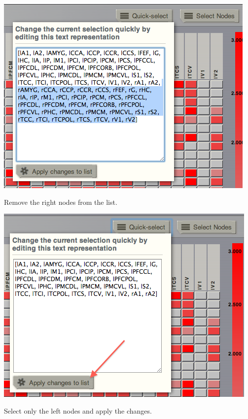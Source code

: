 \documentclass{tufte-handout}
\begin{document}
\begin{marginfigure}%
  \includegraphics[width=\linewidth]{Handout_UI_ModellingStructuralLesions_QuickSelectRemoveNodes.png}%
  \caption{Remove the right nodes from the list.}%
  \label{fig:quickselect_removenodes}%
\end{marginfigure}%

\begin{marginfigure}%
  \includegraphics[width=\linewidth]{Handout_UI_ModellingStructuralLesions_QuickSelectApplyChanges.png}%
  \caption{Select only the left nodes and apply the changes.}%
  \label{fig:quickselect_applychanges}%
\end{marginfigure}%
\end{document}
